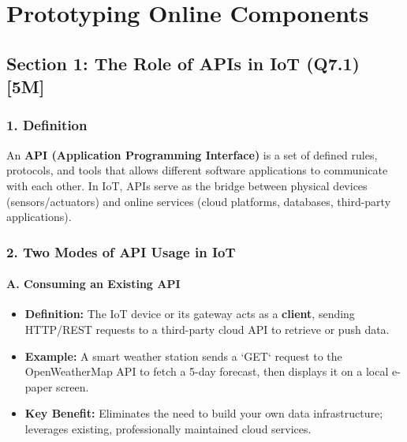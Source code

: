\chapter{Prototyping Online Components}



\section{Section 1: The Role of APIs in IoT (Q7.1) [5M]}

\subsection{1. Definition}
An \textbf{API (Application Programming Interface)} is a set of defined rules, protocols, and tools that allows different software applications to communicate with each other. In IoT, APIs serve as the bridge between physical devices (sensors/actuators) and online services (cloud platforms, databases, third-party applications).


\subsection{2. Two Modes of API Usage in IoT}

\subsubsection{A. Consuming an Existing API}
\begin{itemize}
  \item   \textbf{Definition:} The IoT device or its gateway acts as a \textbf{client}, sending HTTP/REST requests to a third-party cloud API to retrieve or push data.
  \item   \textbf{Example:} A smart weather station sends a `GET` request to the OpenWeatherMap API to fetch a 5-day forecast, then displays it on a local e-paper screen.
  \item   \textbf{Key Benefit:} Eliminates the need to build your own data infrastructure; leverages existing, professionally maintained cloud services.
\end{itemize}

